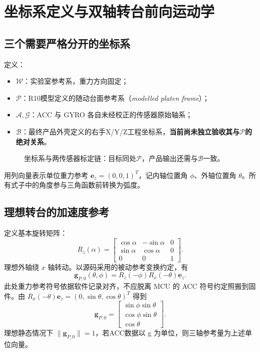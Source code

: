 \documentclass[UTF8,a4paper,11pt,oneside,openany,fontset=none]{ctexbook}
\newcommand{\vct}[1]{\bm{#1}}
\begin{document}
\chapter{坐标系定义与双轴转台前向运动学}
\section{三个需要严格分开的坐标系}
定义：
\begin{itemize}
\item $\mathcal W$：实验室参考系，重力方向固定；
\item $\mathcal P$：R10模型定义的随动台面参考系（\emph{modelled platen frame}）；
\item $\mathcal A,\mathcal G$：ACC 与 GYRO 各自未经校正的传感器原始轴系；
\item $\mathcal B$：最终产品外壳定义的右手X/Y/Z工程坐标系，\textbf{当前尚未独立验收其与$\mathcal P$的绝对关系}。
\end{itemize}
\begin{figure}[htbp]\centering\caption{坐标系与两传感器标定链：目标同处$\mathcal P$，产品输出还需与$\mathcal B$一致。}\end{figure}

用列向量表示单位重力参考 $\vct e_z=(0,0,1)^T$，记内轴位置角 $\phi$、外轴位置角 $\theta$。所有式子中的角度参与三角函数前转换为弧度。

\section{理想转台的加速度参考}
定义基本旋转矩阵：
\begin{equation}
R_z(\alpha)=\begin{bmatrix}\cos\alpha&-\sin\alpha&0\\\sin\alpha&\cos\alpha&0\\0&0&1\end{bmatrix}.
\end{equation}
理想外轴绕 $x$ 轴转动。以源码采用的被动参考变换约定，有
\begin{equation}\label{eq:ideal_acc}
\vct g_{P,0}(\theta,\phi)=R_z(-\phi)R_x(-\theta)\vct e_z.
\end{equation}
此处重力参考符号依据软件记录对齐，不应脱离 MCU 的 ACC 符号约定照搬到固件。由 $R_x(-\theta)\vct e_z=(0,\sin\theta,\cos\theta)^T$ 得到
\begin{equation}
\vct g_{P,0}=\begin{bmatrix}\sin\phi\sin\theta\\\cos\phi\sin\theta\\\cos\theta\end{bmatrix}.
\end{equation}
理想静态情况下 $\|\vct g_{P,0}\|=1$，若ACC数据以 g 为单位，则三轴参考量为上述单位向量。
\end{document}
